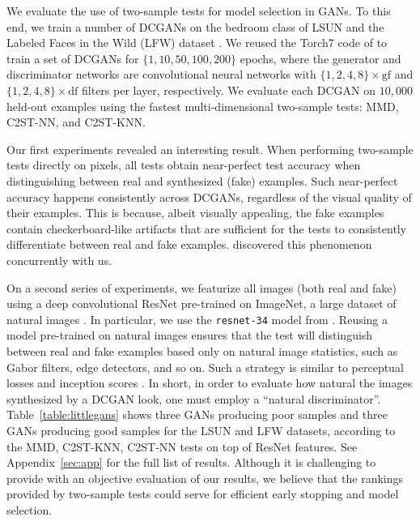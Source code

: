 \documentclass[a4paper]{article}
\begin{document}
  We evaluate the use of two-sample tests for model selection in GANs. 
  To this end, we train a number of DCGANs
  \citep{radford2015unsupervised} on the bedroom class of LSUN
  \citep{lsun} and the Labeled Faces in the Wild (LFW) dataset \citep{lfw}. We
  reused the Torch7 code of \citet{radford2015unsupervised} to train a set of
  DCGANs for $\{1,10,50,100,200\}$ epochs, where the generator and
  discriminator networks are convolutional neural networks
  \citep{lecun1998gradient} with $\{1,2,4,8\}\times\text{gf}$ and
  $\{1,2,4,8\}\times\text{df}$ filters per layer, respectively. We evaluate 
  each DCGAN on $10,000$ held-out examples using the fastest
  multi-dimensional two-sample tests: MMD, C2ST-NN, and C2ST-KNN.

  Our first experiments revealed an interesting result. When
  performing two-sample tests directly on pixels, all tests obtain
  near-perfect test accuracy when distinguishing between real and synthesized
  (fake) examples. Such near-perfect accuracy happens consistently across
  DCGANs, regardless of the visual quality of their examples. This is because,
  albeit visually appealing, the fake examples contain checkerboard-like
  artifacts that are sufficient for the tests to consistently
  differentiate between real and fake examples. 
  \citet{odena2016deconvolution} discovered this phenomenon concurrently with us. 
  
  On a second series of
  experiments, we featurize all images (both real and fake) using a deep
  convolutional ResNet \citep{he2015deep} pre-trained on ImageNet, a
  large dataset of natural images \citep{imagenet}. In particular, we use the
  \texttt{resnet-34} model from \citet{resnet}. Reusing a model pre-trained on
  natural images ensures that the test will distinguish between real and fake
  examples based only on natural image statistics, such as Gabor filters, edge
  detectors, and so on. Such a strategy is similar to perceptual
  losses \citep{perceptual} and inception scores \citep{salimans16}.
  In short, in order to evaluate how natural the images
  synthesized by a DCGAN look, one must employ a ``natural discriminator''.
  Table~\ref{table:littlegans} shows three GANs producing poor samples and
  three GANs producing good samples for the LSUN and LFW datasets, according to
  the MMD, C2ST-KNN, C2ST-NN tests on top of ResNet features. See
  Appendix~\ref{sec:app} for the full list of results. Although it is
  challenging to provide with an objective evaluation of our results, we
  believe that the rankings provided by two-sample tests could serve for efficient
  early stopping and model selection.
\end{document}
